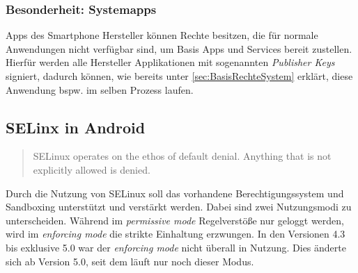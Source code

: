 	\subsubsection{Besonderheit: Systemapps}
	Apps des Smartphone Hersteller können Rechte besitzen, die für normale Anwendungen nicht verfügbar sind, um Basis Apps und Services bereit zustellen. Hierfür werden alle Hersteller Applikationen mit sogenannten \textit{Publisher Keys} signiert, dadurch können, wie bereits unter \ref{sec:BasisRechteSystem} erklärt, diese Anwendung bspw. im selben Prozess laufen.
	
	\subsection{SELinx in Android}
	\begin{quote}
	SELinux operates on the ethos of default denial. Anything that is not explicitly allowed is denied.\cite{SELinuxAndroid}
	\end{quote}
	Durch die Nutzung von SELinux soll das vorhandene Berechtigungssystem und Sandboxing unterstützt und verstärkt werden. Dabei sind zwei Nutzungsmodi zu unterscheiden. Während im \textit{permissive mode} Regelverstöße nur geloggt werden, wird im \textit{enforcing mode} die strikte Einhaltung erzwungen. In den Versionen 4.3 bis exklusive 5.0 war der \textit{enforcing mode} nicht überall in Nutzung. Dies änderte sich ab Version 5.0, seit dem läuft nur noch dieser Modus.
	 
	
	

	
